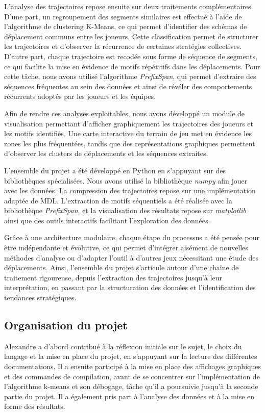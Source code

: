 \documentclass{article}
\begin{document}
        L’analyse des trajectoires repose ensuite sur deux traitements complémentaires. D’une part, un regroupement des segments similaires est effectué à l’aide de l’algorithme de clustering K-Means, ce qui permet d’identifier des schémas de déplacement communs entre les joueurs. Cette classification permet de structurer les trajectoires et d’observer la récurrence de certaines stratégies collectives. D’autre part, chaque trajectoire est recodée sous forme de séquence de segments, ce qui facilite la mise en évidence de motifs répétitifs dans les déplacements. Pour cette tâche, nous avons utilisé l’algorithme \textit{PrefixSpan}, qui permet d’extraire des séquences fréquentes au sein des données et ainsi de révéler des comportements récurrents adoptés par les joueurs et les équipes.
        
        Afin de rendre ces analyses exploitables, nous avons développé un module de visualisation permettant d’afficher graphiquement les trajectoires des joueurs et les motifs identifiés. Une carte interactive du terrain de jeu met en évidence les zones les plus fréquentées, tandis que des représentations graphiques permettent d’observer les clusters de déplacements et les séquences extraites.
        
        L’ensemble du projet a été développé en Python en s’appuyant sur des bibliothèques spécialisées. Nous avons utilisé la bibliothèque \textit{numpy} afin jouer avec les données. La compression des trajectoires repose sur une implémentation adaptée de MDL. L’extraction de motifs séquentiels a été réalisée avec la bibliothèque \textit{PrefixSpan}, et la visualisation des résultats repose sur \textit{matplotlib} ainsi que des outils interactifs facilitant l’exploration des données.
        
        Grâce à une architecture modulaire, chaque étape du processus a été pensée pour être indépendante et évolutive, ce qui permet d’intégrer aisément de nouvelles méthodes d’analyse ou d’adapter l’outil à d’autres jeux nécessitant une étude des déplacements. Ainsi, l’ensemble du projet s’articule autour d’une chaîne de traitement rigoureuse, depuis l’extraction des trajectoires jusqu’à leur interprétation, en passant par la structuration des données et l’identification des tendances stratégiques.

        
        \subsection{Organisation du projet}
        Alexandre a d’abord contribué à la réflexion initiale sur le sujet, le choix du langage et la mise en place du projet, en s’appuyant sur la lecture des différentes documentations. Il a ensuite participé à la mise en place des affichages graphiques et des commandes de compilation, avant de se concentrer sur l’implémentation de l’algorithme k-means et son débogage, tâche qu’il a poursuivie jusqu’à la seconde partie du projet. Il a également pris part à l’analyse des données et à la mise en forme des résultats.
        
\end{document}
